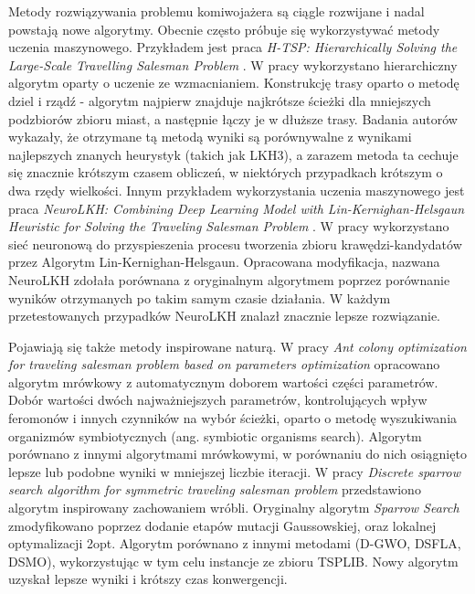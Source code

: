 Metody rozwiązywania problemu komiwojażera są ciągle rozwijane i nadal powstają nowe algorytmy.
Obecnie często próbuje się wykorzystywać metody uczenia maszynowego.
Przykładem jest praca \textit{H-TSP: Hierarchically Solving the Large-Scale Travelling Salesman Problem} \cite{DBLP:journals/corr/abs-2304-09395}.
W pracy wykorzystano hierarchiczny algorytm oparty o uczenie ze wzmacnianiem. Konstrukcję trasy oparto o metodę dziel i rządź - algorytm
najpierw znajduje najkrótsze ścieżki dla mniejszych podzbiorów zbioru miast, a następnie łączy je w dłuższe trasy.
Badania autorów wykazały, że otrzymane tą metodą wyniki są porównywalne z wynikami najlepszych znanych heurystyk (takich jak LKH3),
a zarazem metoda ta cechuje się znacznie krótszym czasem obliczeń, w niektórych przypadkach krótszym o dwa rzędy wielkości.
Innym przykładem wykorzystania uczenia maszynowego jest praca \textit{NeuroLKH: Combining Deep Learning Model with
Lin-Kernighan-Helsgaun Heuristic for Solving the Traveling Salesman Problem} \cite{DBLP:conf/nips/XinSCZ21}.
W pracy wykorzystano sieć neuronową do przyspieszenia procesu tworzenia zbioru krawędzi-kandydatów przez Algorytm Lin-Kernighan-Helsgaun.
Opracowana modyfikacja, nazwana NeuroLKH zdołała porównana z oryginalnym algorytmem poprzez porównanie wyników otrzymanych po takim samym czasie działania.
W każdym przetestowanych przypadków NeuroLKH znalazł znacznie lepsze rozwiązanie.

Pojawiają się także metody inspirowane naturą.
W pracy \textit{Ant colony optimization for traveling salesman problem based on parameters optimization}
opracowano algorytm mrówkowy z automatycznym doborem wartości części parametrów.
Dobór wartości dwóch najważniejszych parametrów, kontrolujących wpływ feromonów i innych czynników na wybór ścieżki,
oparto o metodę wyszukiwania organizmów symbiotycznych (ang. symbiotic organisms search).
Algorytm porównano z innymi algorytmami mrówkowymi, w porównaniu do nich osiągnięto lepsze lub podobne wyniki w mniejszej liczbie iteracji.
W pracy \textit{Discrete sparrow search algorithm for symmetric traveling salesman problem} \cite{DBLP:journals/asc/ZhangH22} przedstawiono algorytm inspirowany zachowaniem wróbli.
Oryginalny algorytm \textit{Sparrow Search} zmodyfikowano poprzez dodanie etapów mutacji Gaussowskiej, oraz lokalnej optymalizacji 2opt.
Algorytm porównano z innymi metodami (D-GWO, DSFLA, DSMO), wykorzystując w tym celu instancje ze zbioru TSPLIB.
Nowy algorytm uzyskał lepsze wyniki i krótszy czas konwergencji.



